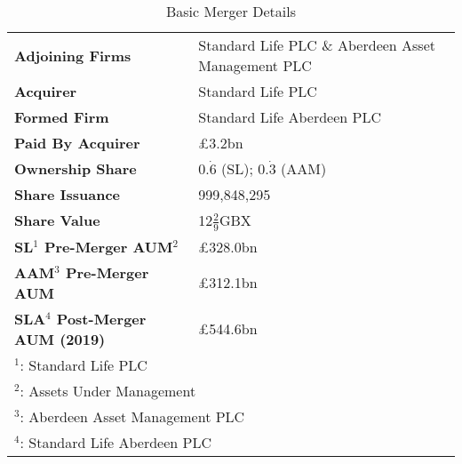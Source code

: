 \documentclass[11pt, english]{article}
\begin{document}
\begin{table}[h]
        \scriptsize
	\renewcommand{\arraystretch}{1.25}
\begin{center}
\begin{tabular}{ p{5cm} p{7.5cm} }
        \hline
        \textbf{Adjoining Firms} & Standard Life PLC \& Aberdeen Asset Management PLC\\
        \textbf{Acquirer} & Standard Life PLC\\
        \textbf{Formed Firm} & Standard Life Aberdeen PLC\\
        \textbf{Paid By Acquirer} & \pounds3.2bn\\ 
        \textbf{Ownership Share} & $0.\dot{6}$ (SL); $0.\dot{3}$ (AAM)\\
        \textbf{Share Issuance} & 999,848,295\\
        \textbf{Share Value} & 12$\frac{2}{9}$GBX\\
        \textbf{SL$^1$ Pre-Merger AUM$^2$} & \pounds328.0bn\\
        \textbf{AAM$^3$ Pre-Merger AUM} & \pounds312.1bn\\
	\textbf{SLA$^4$ Post-Merger AUM (2019)} & \pounds544.6bn\\
        \hline
        \multicolumn{2}{p{12cm}}{$^1$: Standard Life PLC}\\
        \multicolumn{2}{p{12cm}}{$^2$: Assets Under Management}\\
        \multicolumn{2}{p{12cm}}{$^3$: Aberdeen Asset Management PLC}\\
        \multicolumn{2}{p{12cm}}{$^4$: Standard Life Aberdeen PLC}\\
        \hline
\end{tabular}
        \caption{Basic Merger Details}
\end{center}
\end{table}
%
%
\end{document}
